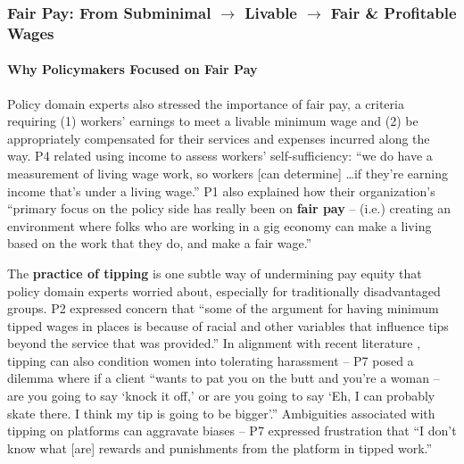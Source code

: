 {\subsubsection{Fair Pay{: From Subminimal $\rightarrow$ Livable $\rightarrow$ Fair \& Profitable Wages}} \label{pde_pay}
\paragraph{Why Policymakers Focused on Fair Pay}
{Policy domain experts} also stressed the importance of fair pay, a criteria requiring (1) workers' earnings to meet a livable minimum wage and (2) be appropriately compensated for their services and expenses incurred along the way. P4 related using income to assess workers' self-sufficiency: ``we do have a measurement of living wage work, so workers [can determine]  \dots  if they're earning income that's under a living wage.'' P1 also explained how their organization's ``primary focus on the policy side has really been on \textbf{fair pay} -- (i.e.) creating an environment where folks who are working in a gig economy can make a living based on the work that they do, and make a fair wage.'' 

The \textbf{practice of tipping} is {one} subtle way of {undermining} pay equity {that policy domain experts worried about}, especially for traditionally disadvantaged groups. P2 expressed concern that ``some of the argument for having minimum tipped wages in places is because of racial and other variables that influence tips beyond the service that was provided.'' {In alignment with recent literature \cite{5qBZ},} tipping can also condition women into tolerating harassment {-- P7 posed a dilemma where if a client} ``wants to pat you on the butt and you're a woman – are you going to say ‘knock it off,' or are you going to say ‘Eh, I can probably skate there. I think my tip is going to be bigger'.'' Ambiguities associated with tipping on platforms can aggravate biases – P7 expressed frustration that ``I don't know what [are] rewards and punishments from the platform in tipped work.'' 

}
